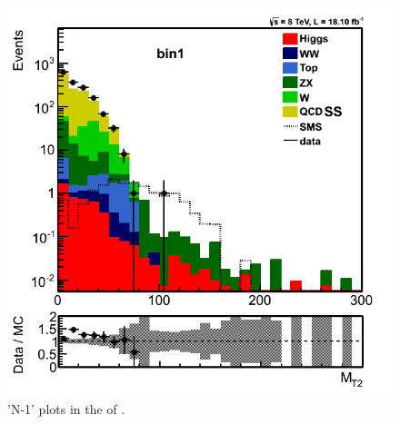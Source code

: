 \begin{figure}[!Hhtb]
\includegraphics[angle=0,scale=0.35]{TauTauFigs/MT2_bin1_14nov.png} 
\caption{'N-1' plots in the \binone of \tauTau.}
\label{fig:bin1}
\end{figure}

